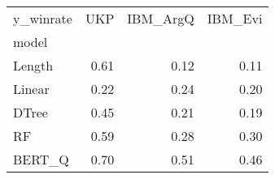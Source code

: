 \begin{tabular}{lrrr}
\toprule
y\_winrate &   UKP &  IBM\_ArgQ &  IBM\_Evi \\
model  &       &           &          \\
\midrule
Length &  0.61 &      0.12 &     0.11 \\
Linear &  0.22 &      0.24 &     0.20 \\
DTree  &  0.45 &      0.21 &     0.19 \\
RF     &  0.59 &      0.28 &     0.30 \\
BERT\_Q &  0.70 &      0.51 &     0.46 \\
\bottomrule
\end{tabular}
